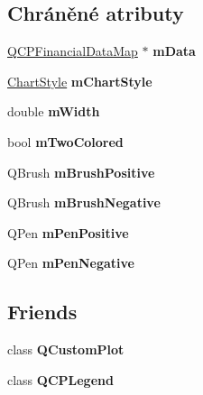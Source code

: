 \subsection*{Chráněné atributy}
\begin{DoxyCompactItemize}
\item 
\hypertarget{classQCPFinancial_a475f63587ca1077d8c30aaf2b71ae026}{}\hyperlink{qcustomplot_8h_a745c09823fae0974b50beca9bc3b3d7d}{Q\+C\+P\+Financial\+Data\+Map} $\ast$ {\bfseries m\+Data}\label{classQCPFinancial_a475f63587ca1077d8c30aaf2b71ae026}

\item 
\hypertarget{classQCPFinancial_ab65c2ce8d6354451870bb44b894c1e92}{}\hyperlink{classQCPFinancial_a0f800e21ee98d646dfc6f8f89d10ebfb}{Chart\+Style} {\bfseries m\+Chart\+Style}\label{classQCPFinancial_ab65c2ce8d6354451870bb44b894c1e92}

\item 
\hypertarget{classQCPFinancial_af630e5eb8485146b9c777e63fd1cf993}{}double {\bfseries m\+Width}\label{classQCPFinancial_af630e5eb8485146b9c777e63fd1cf993}

\item 
\hypertarget{classQCPFinancial_a6afe919190b884d9bac026cefcc8c0a8}{}bool {\bfseries m\+Two\+Colored}\label{classQCPFinancial_a6afe919190b884d9bac026cefcc8c0a8}

\item 
\hypertarget{classQCPFinancial_ab7e6eed16260a2f88ca6bd940dffea79}{}Q\+Brush {\bfseries m\+Brush\+Positive}\label{classQCPFinancial_ab7e6eed16260a2f88ca6bd940dffea79}

\item 
\hypertarget{classQCPFinancial_acb0e31874b7a1deb56bd42e8ab3e68f2}{}Q\+Brush {\bfseries m\+Brush\+Negative}\label{classQCPFinancial_acb0e31874b7a1deb56bd42e8ab3e68f2}

\item 
\hypertarget{classQCPFinancial_aa6599186f417ba615caebb3f6c762bd8}{}Q\+Pen {\bfseries m\+Pen\+Positive}\label{classQCPFinancial_aa6599186f417ba615caebb3f6c762bd8}

\item 
\hypertarget{classQCPFinancial_a263fbfefde2cc19c8d4024a8319c2bbb}{}Q\+Pen {\bfseries m\+Pen\+Negative}\label{classQCPFinancial_a263fbfefde2cc19c8d4024a8319c2bbb}

\end{DoxyCompactItemize}
\subsection*{Friends}
\begin{DoxyCompactItemize}
\item 
\hypertarget{classQCPFinancial_a1cdf9df76adcfae45261690aa0ca2198}{}class {\bfseries Q\+Custom\+Plot}\label{classQCPFinancial_a1cdf9df76adcfae45261690aa0ca2198}

\item 
\hypertarget{classQCPFinancial_a8429035e7adfbd7f05805a6530ad5e3b}{}class {\bfseries Q\+C\+P\+Legend}\label{classQCPFinancial_a8429035e7adfbd7f05805a6530ad5e3b}

\end{DoxyCompactItemize}
